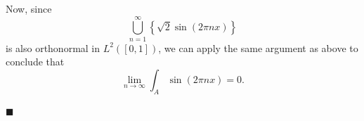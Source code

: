 \documentclass[12pt]{article}
\begin{document}
Now, since $$\bigcup\limits_{n=1}^{\infty}\left\lbrace \sqrt{2}\sin(2\pi n x)\right\rbrace$$ is also orthonormal in $L^2([0,1])$, we can apply the same argument as above to conclude that $$\lim\limits_{n\rightarrow\infty} \int_A \sin(2\pi n x) = 0.$$


\hfill$\blacksquare$

\vfill

\begin{center}
\\
\vspace{2mm}
\vspace{-0.65cm}
\hrulefill \\
\vspace{-0.95cm}
\hrulefill
\end{center}
\end{document}
